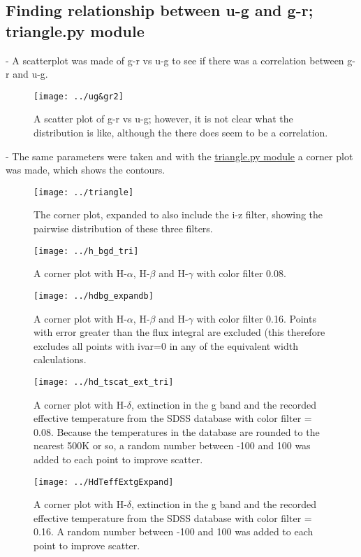 \documentclass[12pt]{article}
\begin{document}
\subsection{Finding relationship between u-g and g-r; triangle.py module}
- A scatterplot was made of g-r vs u-g to see if there was a correlation between g-r and u-g. 
\begin{figure}
\texttt{[image: ../ug\&gr2]}\\
\caption{A scatter plot of g-r vs u-g; however, it is not clear what the distribution is like, although the there does seem to be a correlation.}
\end{figure}
- The same parameters were taken and with the \href{https://github.com/dfm/triangle.py}{triangle.py module} a corner plot was made, which shows the contours.\\
\begin{figure}
\texttt{[image: ../triangle]}\\
\caption{The corner plot, expanded to also include the i-z filter, showing the pairwise distribution of these three filters.}
\end{figure}
\begin{figure}
\texttt{[image: ../h\_bgd\_tri]}\\
\caption{A corner plot with H-$\alpha$, H-$\beta$ and H-$\gamma$ with color filter 0.08.}
\end{figure}
\begin{figure}
\texttt{[image: ../hdbg\_expandb]}\\
\caption{A corner plot with H-$\alpha$, H-$\beta$ and H-$\gamma$ with color filter 0.16. Points with error greater than the flux integral are excluded (this therefore excludes all points with ivar=0 in any of the equivalent width calculations.}
\end{figure}
\begin{figure}
\texttt{[image: ../hd\_tscat\_ext\_tri]}\\
\caption{A corner plot with H-$\delta$, extinction in the g band and the recorded effective temperature from the SDSS database with color filter = 0.08. Because the temperatures in the database are rounded to the nearest 500K or so, a random number between -100 and 100 was added to each point to improve scatter.}
\end{figure}
\begin{figure}
\texttt{[image: ../HdTeffExtgExpand]}\\
\caption{A corner plot with H-$\delta$, extinction in the g band and the recorded effective temperature from the SDSS database with color filter = 0.16. A random number between -100 and 100 was added to each point to improve scatter.} 
\end{figure}
\end{document}

